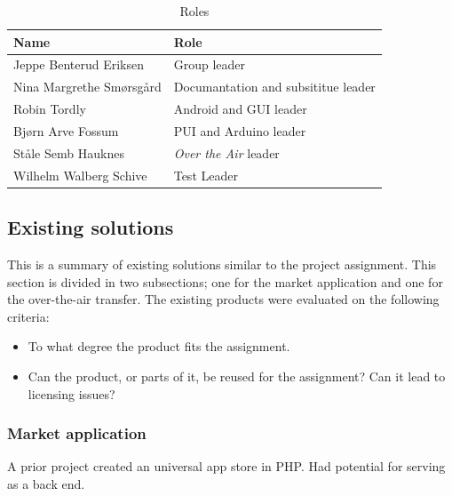 \begin{table}
\begin{tabular}{|l|l|}
\hline
	{\bf Name} & {\bf Role}\\
\hline
	Jeppe Benterud Eriksen & Group leader\\
\hline
	Nina Margrethe Smørsgård & Documantation and subsititue leader\\
\hline
	Robin Tordly & Android and GUI leader\\
\hline
	Bjørn Arve Fossum & PUI and Arduino leader\\
\hline
	Ståle Semb Hauknes & \emph{Over the Air} leader\\
\hline
	Wilhelm Walberg Schive & Test Leader\\
\hline
\end{tabular}
\caption{Roles}
\end{table}

\subsection{Existing solutions}
This is a summary of existing solutions similar to the project assignment. This section is divided in two subsections; one for the market application and one for the over-the-air transfer. The existing products were evaluated on the following criteria:
\begin{itemize}
	\item{To what degree the product fits the assignment.}
	\item{Can the product, or parts of it, be reused for the assignment? Can it lead to licensing issues?}
\end{itemize}

\subsubsection{Market application}
A prior project created an universal app store in PHP. Had potential for serving as a back end.

